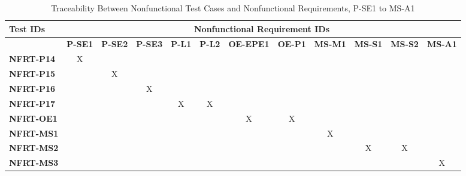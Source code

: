 \documentclass[12pt, titlepage]{article}
\begin{document}
\begin{landscape}
			\begin{longtable}{|l|ccccccccccc|}
	\caption{Traceability Between Nonfunctional Test Cases and Nonfunctional Requirements, P-SE1 to MS-A1}                                                                                                                                                                                                                           \\
		\hline
		\textbf{Test IDs}   & \multicolumn{11}{c|}{\textbf{Nonfunctional Requirement IDs}}                                                                                                                                                                                                                 \\
		\hline
		~                   & \textbf{P-SE1} & \textbf{P-SE2} & \textbf{P-SE3} & \textbf{P-L1} & \textbf{P-L2} & \textbf{OE-EPE1} & \textbf{OE-P1} & \textbf{MS-M1} & \textbf{MS-S1} & \textbf{MS-S2} & \textbf{MS-A1}  \\
		\hline
		\textbf{NFRT-P14} & X                                                         & ~             & ~             & ~             & ~             & ~             & ~             & ~             & ~             & ~ &~\\
		\textbf{NFRT-P15} & ~                                                         & X             & ~             & ~             & ~             & ~             & ~             & ~             & ~             & ~ &~\\
		\textbf{NFRT-P16} & ~                                                         & ~             & X             & ~             & ~             & ~             & ~             & ~             & ~             & ~ &~\\
		\textbf{NFRT-P17} & ~                                                         & ~             & ~             & X             & X             & ~             & ~             & ~             & ~             & ~ &~\\
		\textbf{NFRT-OE1} & ~                                                         & ~             & ~             & ~             & ~             & X             & X             & ~             & ~             & ~ &~\\
		\textbf{NFRT-MS1} & ~                                                         & ~             & ~             & ~             & ~             & ~             & ~             & X             & ~             & ~ &~\\
		\textbf{NFRT-MS2} & ~                                                         & ~             & ~             & ~             & ~             & ~             & ~             & ~             & X             &X  &~\\
		\textbf{NFRT-MS3} & ~                                                         & ~             & ~             & ~             & ~             & ~             & ~             & ~             & ~             &~  &X\\
		\hline
	\end{longtable}
	

\end{landscape}
\end{document}
